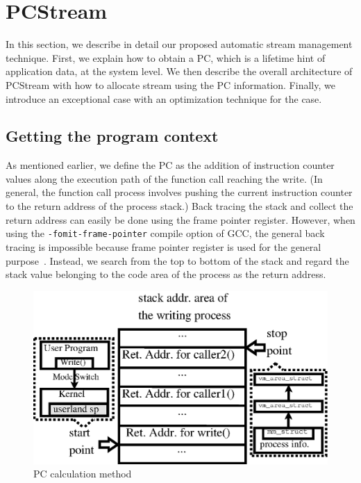 \section{PCStream}
In this section, we describe in detail our proposed automatic stream management technique.
First, we explain how to obtain a PC, which is a lifetime hint of application data, at the system level. 
We then describe the overall architecture of PCStream with how to allocate stream using the PC information. 
Finally, we introduce an exceptional case with an optimization technique for the case.

\subsection{Getting the program context}
As mentioned earlier, we define the PC as the addition of instruction counter values along the 
execution path of the function call reaching the write. 
(In general, the function call process involves pushing the current instruction 
counter to the return address of the process stack.) 
Back tracing the stack and collect the return address can easily be done using the frame pointer register. 
However, when using the {\tt -fomit-frame-pointer} compile option of GCC, 
the general back tracing is impossible because frame pointer register is used for the general purpose~\cite{GCC}. 
Instead, we search from the top to bottom of the stack and regard the stack value 
belonging to the code area of the process as the return address. 

\begin{figure}[t]
	\centering
	\includegraphics[width=0.7\linewidth]{figure/getpc}
	\caption{PC calculation method}
	\label{fig:getpc}
	\vspace{-20pt}
\end{figure}


